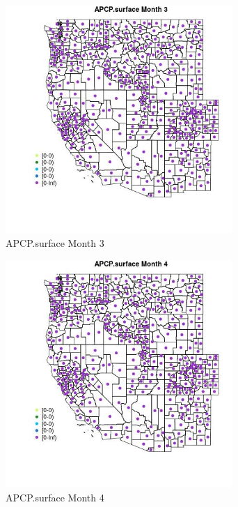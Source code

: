 \begin{figure} 
\centering  
\includegraphics[width=0.77\textwidth]{Code_Outputs/df_report_ML_predictors_CountyCentroid_Locations_Dates_2008-01-01to2018-12-31_MapObsMo3APCPsurface.jpg} 
\caption{\label{fig:df_report_ML_predictors_CountyCentroid_Locations_Dates_2008-01-01to2018-12-31MapObsMo3APCPsurface}APCP.surface Month 3} 
\end{figure} 
 

\begin{figure} 
\centering  
\includegraphics[width=0.77\textwidth]{Code_Outputs/df_report_ML_predictors_CountyCentroid_Locations_Dates_2008-01-01to2018-12-31_MapObsMo4APCPsurface.jpg} 
\caption{\label{fig:df_report_ML_predictors_CountyCentroid_Locations_Dates_2008-01-01to2018-12-31MapObsMo4APCPsurface}APCP.surface Month 4} 
\end{figure} 
 

